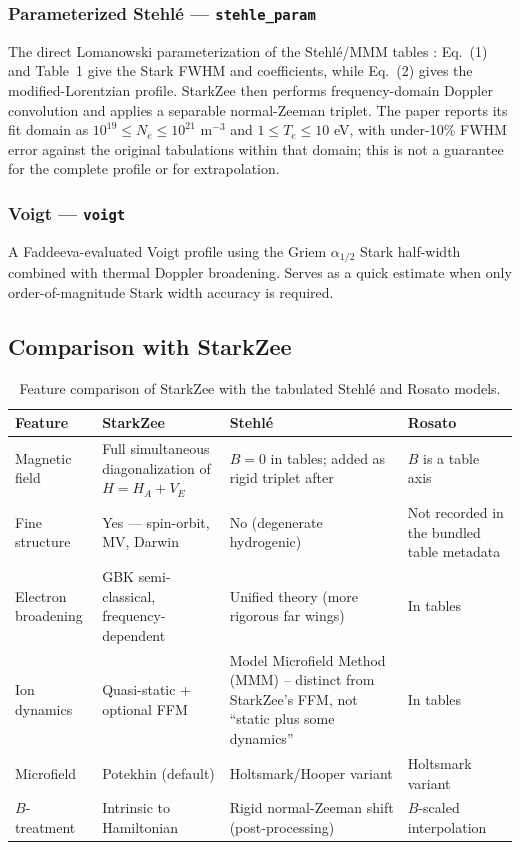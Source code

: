 \documentclass[11pt,a4paper]{article}
\numberwithin{equation}{section}
\begin{document}
\subsubsection{Parameterized Stehlé — \texttt{stehle\_param}}

The direct Lomanowski parameterization of the Stehlé/MMM tables \cite{lomanowski}: Eq.~(1) and Table~1 give the Stark FWHM and coefficients, while Eq.~(2) gives the modified-Lorentzian profile. StarkZee then performs frequency-domain Doppler convolution and applies a separable normal-Zeeman triplet. The paper reports its fit domain as $10^{19}\leq N_e\leq10^{21}$ m$^{-3}$ and $1\leq T_e\leq10$ eV, with under-10\% FWHM error against the original tabulations within that domain; this is not a guarantee for the complete profile or for extrapolation.

\subsubsection{Voigt — \texttt{voigt}}

A Faddeeva-evaluated Voigt profile using the Griem $\alpha_{1/2}$ Stark half-width \cite{griem} combined with thermal Doppler broadening.  Serves as a quick estimate when only order-of-magnitude Stark width accuracy is required.

\subsection{Comparison with StarkZee}

\begin{table}[H]
\centering\small
\begin{tabularx}{\textwidth}{@{}lXXX@{}}
\toprule
\textbf{Feature} & \textbf{StarkZee} & \textbf{Stehlé} & \textbf{Rosato} \\
\midrule
Magnetic field      & Full simultaneous diagonalization of $H = H_A + V_E$
                    & $B = 0$ in tables; added as rigid triplet after
                    & $B$ is a table axis \\[2pt]
Fine structure      & Yes — spin-orbit, MV, Darwin
                    & No (degenerate hydrogenic)
                    & Not recorded in the bundled table metadata \\[2pt]
Electron broadening & GBK semi-classical, frequency-dependent
                    & Unified theory (more rigorous far wings)
                    & In tables \\[2pt]
Ion dynamics        & Quasi-static + optional FFM
                    & Model Microfield Method (MMM) -- distinct from StarkZee's FFM, not ``static plus some dynamics''
                    & In tables \\[2pt]
Microfield          & Potekhin (default) & Holtsmark/Hooper variant & Holtsmark variant \\[2pt]
$B$-treatment       & Intrinsic to Hamiltonian & Rigid normal-Zeeman shift (post-processing) & $B$-scaled interpolation \\
\bottomrule
\end{tabularx}
\caption{Feature comparison of StarkZee with the tabulated Stehlé and Rosato models.}
\label{tab:model_features}
\end{table}
\end{document}
